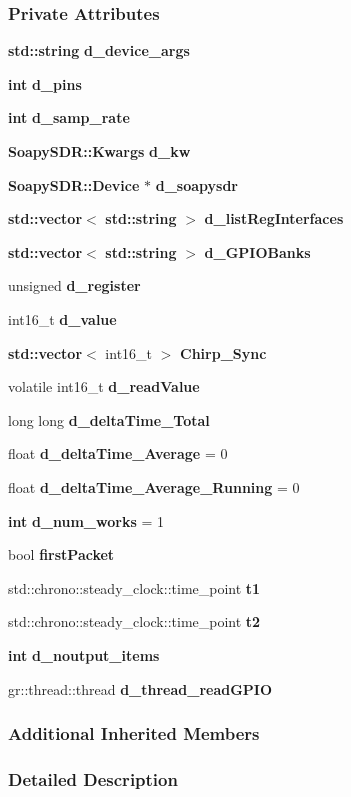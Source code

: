 \subsubsection*{Private Attributes}
\begin{DoxyCompactItemize}
\item 
{\bf std\+::string} {\bf d\+\_\+device\+\_\+args}
\item 
{\bf int} {\bf d\+\_\+pins}
\item 
{\bf int} {\bf d\+\_\+samp\+\_\+rate}
\item 
{\bf Soapy\+S\+D\+R\+::\+Kwargs} {\bf d\+\_\+kw}
\item 
{\bf Soapy\+S\+D\+R\+::\+Device} $\ast$ {\bf d\+\_\+soapysdr}
\item 
{\bf std\+::vector}$<$ {\bf std\+::string} $>$ {\bf d\+\_\+list\+Reg\+Interfaces}
\item 
{\bf std\+::vector}$<$ {\bf std\+::string} $>$ {\bf d\+\_\+\+G\+P\+I\+O\+Banks}
\item 
unsigned {\bf d\+\_\+register}
\item 
int16\+\_\+t {\bf d\+\_\+value}
\item 
{\bf std\+::vector}$<$ int16\+\_\+t $>$ {\bf Chirp\+\_\+\+Sync}
\item 
volatile int16\+\_\+t {\bf d\+\_\+read\+Value}
\item 
long long {\bf d\+\_\+delta\+Time\+\_\+\+Total}
\item 
float {\bf d\+\_\+delta\+Time\+\_\+\+Average} = 0
\item 
float {\bf d\+\_\+delta\+Time\+\_\+\+Average\+\_\+\+Running} = 0
\item 
{\bf int} {\bf d\+\_\+num\+\_\+works} = 1
\item 
bool {\bf first\+Packet}
\item 
std\+::chrono\+::steady\+\_\+clock\+::time\+\_\+point {\bf t1}
\item 
std\+::chrono\+::steady\+\_\+clock\+::time\+\_\+point {\bf t2}
\item 
{\bf int} {\bf d\+\_\+noutput\+\_\+items}
\item 
gr\+::thread\+::thread {\bf d\+\_\+thread\+\_\+read\+G\+P\+IO}
\end{DoxyCompactItemize}
\subsubsection*{Additional Inherited Members}


\subsubsection{Detailed Description}



